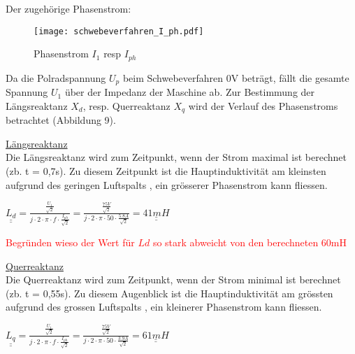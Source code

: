 \begin{flushleft}
\newpage

Der zugehörige Phasenstrom:\\
\vspace{0.3cm}
\begin{figure}[H]
    \centering
        \texttt{[image: schwebeverfahren\_I\_ph.pdf]}
    \caption{Phasenstrom $I_1$ resp $I_{ph}$}
    \label{fig:abb1}
\end{figure}


Da die Polradspannung $U_p$ beim Schwebeverfahren 0V beträgt, fällt die gesamte Spannung $U_1$ über der Impedanz der Maschine ab. 
Zur Bestimmung der Längsreaktanz $X_d$, resp. Querreaktanz $X_q$ wird der Verlauf des Phasenstroms betrachtet (Abbildung 9).\\
\vspace{0.4cm}

\underline{Längsreaktanz}\\
\vspace{0.2cm}
Die Längsreaktanz wird zum Zeitpunkt, wenn der Strom maximal ist  berechnet (zb. t = 0,7s). Zu diesem Zeitpunkt ist die Hauptinduktivität am kleinsten aufgrund des geringen Luftspalts  , ein grösserer Phasenstrom kann fliessen.

\begin{center}
\begin{Large}
$ \underline{\underline{L_d}}= \frac{\frac{U_1}{\sqrt{2}}}{j \cdot 2 \cdot \pi \cdot f \cdot \frac{I_{ph}}{\sqrt{2}} }  = \frac{\frac{75 V}{\sqrt{2}}}{j \cdot 2 \cdot \pi \cdot 50 \cdot \frac{5.8 A}{\sqrt{2}} } = \underline{\underline{41 mH}}$\\
\end{Large}
\end{center}

\textcolor{red}{Begründen wieso der Wert für $Ld$ so stark abweicht von den berechneten 60mH}


\newpage




\underline{Querreaktanz}\\
\vspace{0.2cm}
Die Querreaktanz wird zum Zeitpunkt, wenn der Strom minimal ist  berechnet (zb. t = 0,55s). Zu diesem Augenblick ist die Hauptinduktivität am grössten aufgrund des grossen Luftspalts  , ein kleinerer Phasenstrom kann fliessen.

\begin{center}
\begin{Large}
$ \underline{\underline{L_q}}= \frac{\frac{U_1}{\sqrt{2}}}{j \cdot 2 \cdot \pi \cdot f \cdot \frac{I_{ph}}{\sqrt{2}} }  = \frac{\frac{75 V}{\sqrt{2}}}{j \cdot 2 \cdot \pi \cdot 50 \cdot \frac{3.9 A}{\sqrt{2}} } = \underline{\underline{61 mH}}$\\
\end{Large}
\end{center}



\end{flushleft}
